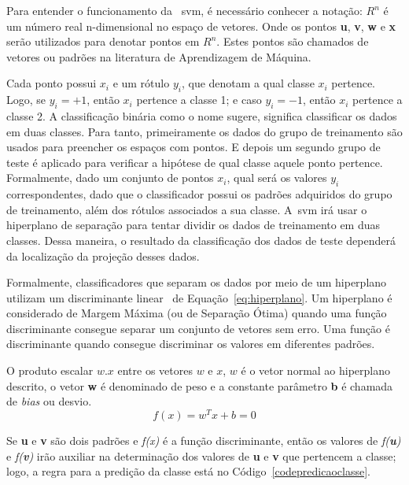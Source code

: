 Para entender o funcionamento da ~\ac{svm}, é necessário conhecer a notação:
\begin{math}
R^{n}
\end{math}
é um número real n-dimensional no espaço de vetores. Onde os pontos \textbf{u}, \textbf{v}, \textbf{w} e \textbf{x} serão utilizados para denotar pontos em 
\begin{math}
R^{n}
\end{math}.
Estes pontos são chamados de vetores ou padrões na literatura de Aprendizagem de Máquina.

Cada ponto possui $x_{i}$ e um rótulo $y_{i}$, que denotam a qual classe $x_{i}$ pertence. Logo, se $y_{i} = + 1$, então $x_{i}$ pertence a classe 1; e caso $y_{i} = - 1$, então $x_{i}$ pertence a classe 2. A classificação binária como o nome sugere, significa classificar os dados em duas classes. Para tanto, primeiramente os dados do grupo de treinamento são usados para preencher os espaços com pontos. E depois um segundo grupo de teste é aplicado para verificar a hipótese de qual classe aquele ponto pertence. Formalmente, dado um conjunto de pontos $x_{i}$, qual será os valores $y_{i}$ correspondentes, dado que o classificador possui os padrões adquiridos do grupo de treinamento, além dos rótulos associados a sua classe. A~\ac{svm} irá usar o hiperplano de separação para tentar dividir os dados de treinamento em duas classes. Dessa maneira, o resultado da classificação dos dados de teste dependerá da localização da projeção desses dados.

Formalmente, classificadores que separam os dados por meio de um hiperplano utilizam um discriminante linear~\cite{valt2010} de Equação~\ref{eq:hiperplano}. Um hiperplano é considerado de Margem Máxima (ou de Separação Ótima) quando uma função discriminante consegue separar um conjunto de vetores sem erro. Uma função é discriminante quando consegue discriminar os valores em diferentes padrões. 

O produto escalar $ w.x $ entre os vetores $ w $ e $ x $, $ w $ é o vetor normal ao hiperplano descrito, o vetor \textbf{w} é denominado de peso e a constante parâmetro \textbf{b} é chamada de \textit{bias} ou desvio.
\linebreak
\begin{equation}
f(x)=w^Tx+b=0
\label{eq:hiperplano}
\end{equation}

Se \textbf{u} e \textbf{v} são dois padrões e \textit{f(x)} é a função discriminante, então os valores de \textit{f(\textbf{u})} e \textit{f(\textbf{v})} irão auxiliar na determinação dos valores de \textbf{u} e \textbf{v} que pertencem a classe; logo, a regra para a predição da classe está no Código~\ref{codepredicaoclasse}. 

